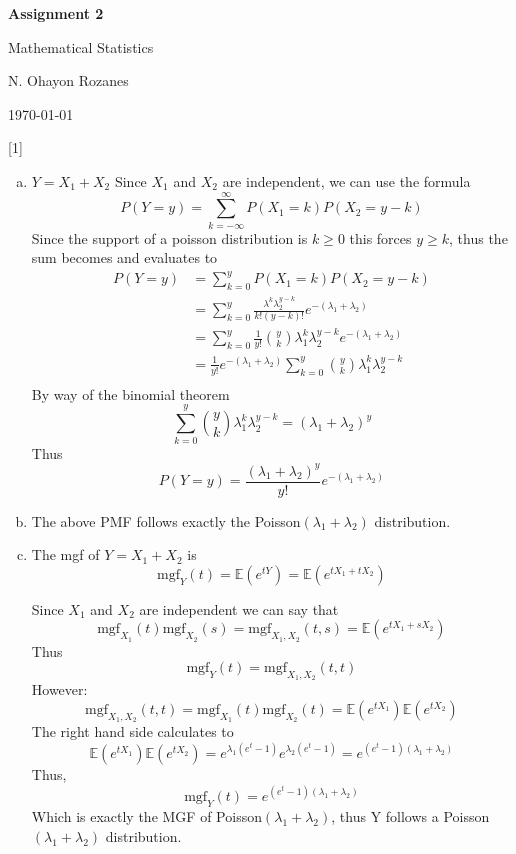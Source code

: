 \documentclass{article} %
\newcommand{\question}[2][]{
  \begin{flushleft}
    \textbf{Question #1}: \textit{#2}

\end{flushleft}}
\newcommand{\maketitletwo}[2][]{
  \begin{center}
    \Large{\textbf{Assignment #1}

    Mathematical Statistics} %
    \vspace{5pt}

    \normalsize{N. Ohayon Rozanes  %

    \today}        %
    \vspace{15pt}

\end{center}}
\begin{document}
\maketitletwo[2]  %

\question[1]{ }

\begin{enumerate}[(a)]
  \item $Y = X_1 + X_2$ Since $X_1$ and $X_2$ are independent, we can
    use the formula
    \[
      P(Y = y) = \sum_{k=-\infty}^\infty P(X_1 = k)P(X_2 = y - k)
    \]
    Since the support of a poisson distribution is $k \ge 0$ this
    forces $y \ge k$, thus the sum becomes and evaluates to
    \begin{align*}
      P(Y = y) &= \sum_{k=0}^y P(X_1 = k)P(X_2 = y - k)\\
      &= \sum_{k=0}^y
      \frac{\lambda^k\lambda_2^{y-k}}{k!(y-k)!}e^{-(\lambda_1 + \lambda_2)}\\
      &= \sum_{k=0}^y \frac{1}{y!}\binom{y}{k}\lambda^k_1
      \lambda_2^{y-k}e^{-(\lambda_1 + \lambda_2)}\\
      &= \frac{1}{y!}e^{-(\lambda_1 + \lambda_2)}
      \sum_{k=0}^y
      \binom{y}{k}\lambda^k_1
      \lambda_2^{y-k}\\
    \end{align*}
    By way of the binomial theorem
    \[
      \sum_{k=0}^y
      \binom{y}{k}\lambda^k_1
      \lambda_2^{y-k} =
      (\lambda_1 + \lambda_2)^y
    \]
    Thus
    \[
      P(Y = y) = \frac{(\lambda_1 + \lambda_2)^y}{y!}e^{-(\lambda_1 +
      \lambda_2)}
    \]
  \item The above PMF follows exactly the Poisson$(\lambda_1 +
    \lambda_2)$ distribution.
  \item The mgf of $Y = X_1 + X_2$ is
    $$
    \text{mgf}_Y(t) = \mathbb{E}(e^{tY}) = \mathbb{E}(e^{tX_1 + tX_2})
    $$

    Since $X_1$ and $X_2$ are independent we can say that
    $$
    \text{mgf}_{X_1}(t)\text{mgf}_{X_2}(s) = \text{mgf}_{X_1, X_2}(t,
    s) = \mathbb{E}(e^{tX_1 + sX_2})
    $$
    Thus
    \[
      \text{mgf}_{Y}(t) = \text{mgf}_{X_1, X_2}(t, t)
    \]
    However:
    \[
      \text{mgf}_{X_1, X_2}(t,t) =
      \text{mgf}_{X_1}(t)\text{mgf}_{X_2}(t)=
      \mathbb{E}(e^{tX_1})\mathbb{E}(e^{tX_2})
    \]
    The right hand side calculates to
    $$
    \mathbb{E}(e^{tX_1})\mathbb{E}(e^{tX_2}) =
    e^{\lambda_1(e^t-1)}e^{\lambda_2(e^t-1)} = e^{(e^t-1)(\lambda_1 +\lambda_2)}
    $$
    Thus,
    \[
      \text{mgf}_Y(t) =  e^{(e^t-1)(\lambda_1 +\lambda_2)}
    \]
    Which is exactly the MGF of Poisson$(\lambda_1 +\lambda_2)$, thus
    Y follows a Poisson$(\lambda_1 + \lambda_2)$ distribution.

\end{enumerate}
\end{document}
